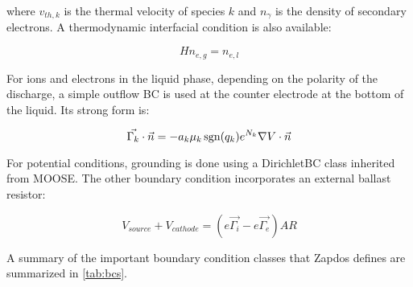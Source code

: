 where $v_{th,k}$ is the thermal velocity of species $k$ and $n_{\gamma}$ is the density of secondary electrons. A thermodynamic interfacial condition is also available:

\begin{equation}
  Hn_{e,g} = n_{e,l}
  \label{eq:electron_bc_thermo_3}
\end{equation}

For ions and electrons in the liquid phase, depending on the polarity of the discharge, a simple outflow BC is used at the counter electrode at the bottom of the liquid. Its strong form is:

\begin{equation}
  \vec{\Gamma_k}\cdot\vec{n} = -a_k \mu_k \operatorname{sgn}(q_k) e^{N_k} \nabla V \cdot \vec{n}
  \label{eq:outflow_3}
\end{equation}

For potential conditions, grounding is done using a DirichletBC class inherited from MOOSE. The other boundary condition incorporates an external ballast resistor:

\begin{equation}
  V_{source} + V_{cathode} = \left(e\vec{\Gamma_i} - e\vec{\Gamma_e}\right)AR
  \label{eq:cathode_3}
\end{equation}

A summary of the important boundary condition classes that Zapdos defines are summarized in \cref{tab:bcs}.

